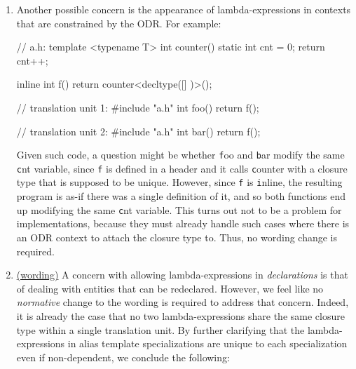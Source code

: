 \documentclass{wg21}
\newcommand{\cc}[1]{\texttt{#1}}
\begin{document}
\begin{enumerate}
    Thus, a function template declaration such as the following will require the
    implementation to make the lambda-expression part of the signature, which is
    specifically what we would like to avoid:
\begin{cpp}
template <unsigned N>
void f(const char (*s)[([]() { return N; })()]) { }
\end{cpp}

    To make sure this does not happen, we propose \hyperref[wording.template]
    {amending \textbf{[temp.over.link]}}.


  \item \label{discussion.ODR}
    Another possible concern is the appearance of lambda-expressions in
    contexts that are constrained by the ODR. For example:

\begin{cpp}
// a.h:
template <typename T>
int counter() {
  static int cnt = 0;
  return cnt++;
}

inline int f() {
  return counter<decltype([] {})>();
}

// translation unit 1:
#include "a.h"
int foo() { return f(); }

// translation unit 2:
#include "a.h"
int bar() { return f(); }
\end{cpp}

    Given such code, a question might be whether \cc foo and \cc bar modify
    the same \cc cnt variable, since \cc f is defined in a header and it calls
    \cc counter with a closure type that is supposed to be unique. However,
    since \cc f is \cc inline, the resulting program is as-if there was a
    single definition of it, and so both functions end up modifying the same
    \cc cnt variable. This turns out not to be a problem for implementations,
    because they must already handle such cases where there is an ODR context
    to attach the closure type to. Thus, no wording change is required.


  \item \label{discussion.redeclarations}
    \hyperref[wording.redeclarations]{(wording)}
    A concern with allowing lambda-expressions in \textit{declarations} is
    that of dealing with entities that can be redeclared. However, we feel like
    no \textit{normative} change to the wording is required to address that concern.
    Indeed, it is already the case that no two lambda-expressions share the same
    closure type within a single translation unit. By further clarifying that the
    lambda-expressions in alias template specializations are unique to each
    specialization even if non-dependent, we conclude the following:


\end{enumerate}
\end{document}
